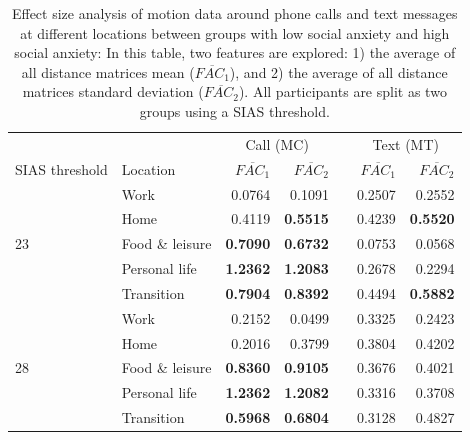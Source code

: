 \begin{table}
\caption{Effect size analysis of motion data around phone calls and text messages at different locations between groups with low social anxiety and high social anxiety: In this table, two features are explored: 1) the average of all distance matrices mean ($\overline{FAC_1}$), and 2) the average of all distance matrices standard deviation ($\overline{FAC_2}$). All participants are split as two groups using a SIAS threshold.
\label{tab:cohensd_matrix_call_text_GPS_2_group}\vspace{6pt}}
\begin{center}
\small
\def\arraystretch{1.5}

	\begin{tabular}{ l @{\hskip 0.5in} l @{\hskip 0.5in} r r r r r}
    \toprule
    							&						& \multicolumn{2}{c}{Call (MC)} 						&	& \multicolumn{2}{c}{Text (MT)} 						\\
                    									\cline{3-4}											\cline{6-7}
    	SIAS threshold			& Location				&$\overline{FAC_1}$		& $\overline{FAC_2}$		&	& $\overline{FAC_1}$		&$\overline{FAC_2}$ 	 	\\
        \hline
        						& Work					& 0.0764				& 0.1091				&	& 0.2507				& 0.2552				\\
        						& Home					& 0.4119				& \textbf{0.5515}				&	& 0.4239				& \textbf{0.5520}				\\
        23						& Food \& leisure		& \textbf{0.7090}				& \textbf{0.6732}				&	& 0.0753				& 0.0568				\\
        						& Personal life			& \textbf{1.2362}				& \textbf{1.2083}				&	& 0.2678				& 0.2294				\\
        						& Transition			& \textbf{0.7904}				& \textbf{0.8392}				&	& 0.4494				& \textbf{0.5882}				\\
        \hline
        						& Work					& 0.2152				& 0.0499				&	& 0.3325				& 0.2423				\\
        						& Home					& 0.2016				& 0.3799				&	& 0.3804				& 0.4202				\\
        28						& Food \& leisure		& \textbf{0.8360}				& \textbf{0.9105}				&	& 0.3676				& 0.4021				\\
        						& Personal life			& \textbf{1.2362}				& \textbf{1.2082}				&	& 0.3316				& 0.3708				\\
        						& Transition			& \textbf{0.5968}				& \textbf{0.6804}				&	& 0.3128				& 0.4827				\\

\end{tabular}
\end{center}
\end{table}
